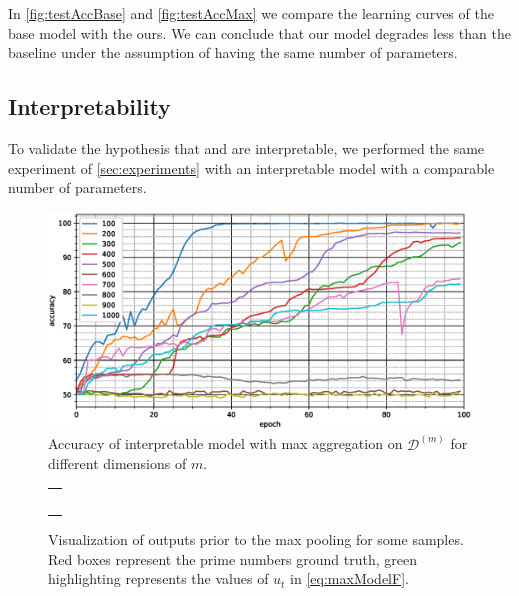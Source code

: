 In \cref{fig:testAccBase} and \cref{fig:testAccMax} we compare
the learning curves of the base model with the ours. We can conclude
that our model degrades less than the baseline under the assumption of
having the same number of parameters.

\subsection{Interpretability}
\label{sec:interpretability}
To validate the
hypothesis that \maxi{} and \softmaxi{} are interpretable,
we performed the same experiment of \cref{sec:experiments}
with an interpretable model with a comparable number of parameters.

\begin{figure}
  \centering
  \includegraphics[width=\floatwidth]{imgMax/accuracy-int.eps}
  \caption{Accuracy of interpretable model with max aggregation on $\mathcal{D}^{(m)}$ for different dimensions of $m$.}
  \label{fig:testAccInt}
\end{figure}

\begin{figure}
  \centering
  \footnotesize
  \begin{tabular}{|p{\floatwidth}|}
    \hline
    \\
    \hline
    \\
    \hline
    \\
    \hline
    \\
    \hline
    \\
    \hline
    \\
    \hline
  \end{tabular}
  \caption{Visualization of outputs prior to the max pooling for some
    samples. Red boxes represent the prime numbers ground
    truth, green highlighting represents the values of $u_t$ in
    \eqref{eq:maxModelF}.}
  \label{fig:testAttention}
\end{figure}

